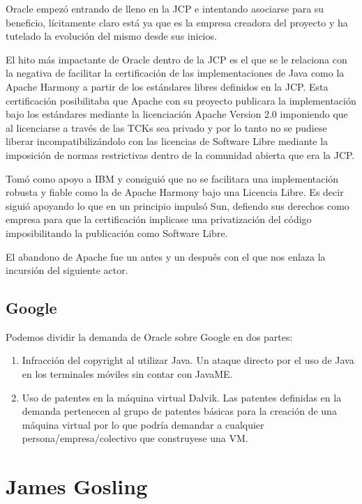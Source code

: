 \documentclass[11pt]{scrartcl}
\begin{document}
Oracle empezó entrando de lleno en la JCP e intentando asociarse para su beneficio, lícitamente claro está ya que es la empresa creadora del proyecto y ha tutelado la evolución del mismo desde sus inicios.

El hito más impactante de Oracle dentro de la JCP es el que se le relaciona con la negativa de facilitar la certificación de las implementaciones de Java como la Apache Harmony a partir de los estándares libres definidos en la JCP. Esta certificación posibilitaba que Apache con su proyecto publicara la implementación bajo los estándares mediante la licenciación Apache Version 2.0 imponiendo que al licenciarse a través de las TCKs sea privado y por lo tanto no se pudiese liberar incompatibilizándolo con las licencias de Software Libre mediante la imposición de normas restrictivas dentro de la comunidad abierta que era la JCP.

Tomó como apoyo a IBM y consiguió que no se facilitara una implementación robusta y fiable como la de Apache Harmony bajo una Licencia Libre. Es decir siguió apoyando lo que en un principio impulsó Sun, defiendo sus derechos como empresa para que la certificación implicase una privatización del código imposibilitando la publicación como Software Libre.

El abandono de Apache fue un antes y un después con el que nos enlaza la incursión del siguiente actor.

\subsection{Google}

Podemos dividir la demanda de Oracle sobre Google en dos partes:
\begin{enumerate}
    \item Infracción del copyright al utilizar Java. Un ataque directo por el uso de Java en los terminales móviles sin contar con JavaME.
    \item Uso de patentes en la máquina virtual Dalvik. Las patentes definidas en la demanda pertenecen al grupo de patentes básicas para la creación de una máquina virtual por lo que podría demandar a cualquier persona/empresa/colectivo que construyese una VM.
\end{enumerate}

\section{James Gosling}
\end{document}
